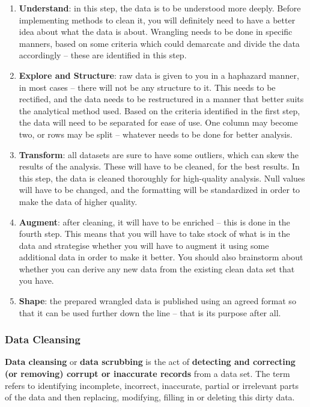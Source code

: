 \documentclass[10pt,a4paper]{article}
\begin{document}
\begin{enumerate}
	\item \textbf{Understand}: in this step, the data is to be understood more deeply. Before implementing methods to clean it, you will definitely need to have a better idea about what the data is about. Wrangling needs to be done in specific manners, based on some criteria which could demarcate and divide the data accordingly – these are identified in this step.
	\item \textbf{Explore and Structure}: raw data is given to you in a haphazard manner, in most cases – there will not be any structure to it. This needs to be rectified, and the data needs to be restructured in a manner that better suits the analytical method used. Based on the criteria identified in the first step, the data will need to be separated for ease of use. One column may become two, or rows may be split – whatever needs to be done for better analysis.
	\item \textbf{Transform}: all datasets are sure to have some outliers, which can skew the results of the analysis. These will have to be cleaned, for the best results. In this step, the data is cleaned thoroughly for high-quality analysis. Null values will have to be changed, and the formatting will be standardized in order to make the data of higher quality.
	\item \textbf{Augment}: after cleaning, it will have to be enriched – this is done in the fourth step. This means that you will have to take stock of what is in the data and strategise whether you will have to augment it using some additional data in order to make it better. You should also brainstorm about whether you can derive any new data from the existing clean data set that you have.
	\item \textbf{Shape}: the prepared wrangled data is published using an agreed format so that it can be used further down the line – that is its purpose after all. 
\end{enumerate}
\subsubsection{Data Cleansing}
\textbf{Data cleansing} or \textbf{data scrubbing} is the act of \textbf{detecting and correcting (or removing) corrupt or inaccurate records} from a data set. 
The term refers to identifying incomplete, incorrect, inaccurate, partial or irrelevant parts of the data and then replacing, modifying, filling in or deleting this dirty data.
\pagebreak
\end{document}
